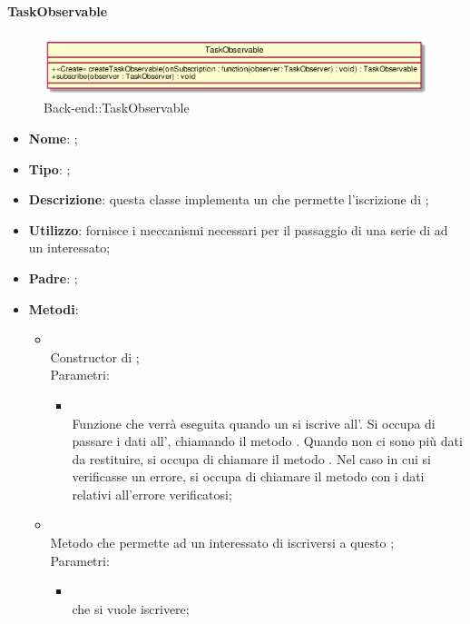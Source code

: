 \hypertarget{TaskObservable_label}{\paragraph{TaskObservable}}
\begin{figure}[h]
	\centering
	\includegraphics[width=\textwidth,height=\textheight,keepaspectratio]{images/ClassTaskObservable.png}
	\caption{Back-end::TaskObservable}
\end{figure}
\begin{itemize}
	\item \textbf{Nome}: ;
	\item \textbf{Tipo}: ;
	\item \textbf{Descrizione}: questa classe implementa un  che permette l'iscrizione di ;
	\item \textbf{Utilizzo}: fornisce i meccanismi necessari per il passaggio di una serie di  ad un  interessato;
	\item \textbf{Padre}: ;
	\item \textbf{Metodi}:
	\begin{itemize}
		\item[]  \\
		Constructor di ;\\
		Parametri:
		\begin{itemize}
			\item {} \\
			Funzione che verrà eseguita quando un  si iscrive all'. Si occupa di passare i dati all', chiamando il metodo . Quando non ci sono più dati da restituire, si occupa di chiamare il metodo . Nel caso in cui si verificasse un errore, si occupa di chiamare il metodo  con i dati relativi all'errore verificatosi;
		\end{itemize}
		\item[]  \\
		Metodo che permette ad un  interessato di iscriversi a questo ;\\
		Parametri:
		\begin{itemize}
			\item {} \\
			 che si vuole iscrivere;
		\end{itemize}
	\end{itemize}
\end{itemize}

